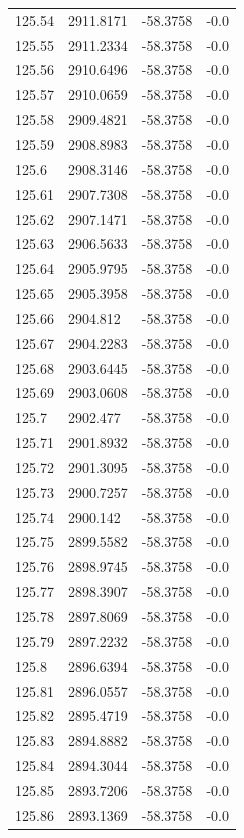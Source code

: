 \begin{table}[H]
\begin{tabular}{llll}
125.54 & 2911.8171 & -58.3758 & -0.0 \\
125.55 & 2911.2334 & -58.3758 & -0.0 \\
125.56 & 2910.6496 & -58.3758 & -0.0 \\
125.57 & 2910.0659 & -58.3758 & -0.0 \\
125.58 & 2909.4821 & -58.3758 & -0.0 \\
125.59 & 2908.8983 & -58.3758 & -0.0 \\
125.6 & 2908.3146 & -58.3758 & -0.0 \\
125.61 & 2907.7308 & -58.3758 & -0.0 \\
125.62 & 2907.1471 & -58.3758 & -0.0 \\
125.63 & 2906.5633 & -58.3758 & -0.0 \\
125.64 & 2905.9795 & -58.3758 & -0.0 \\
125.65 & 2905.3958 & -58.3758 & -0.0 \\
125.66 & 2904.812 & -58.3758 & -0.0 \\
125.67 & 2904.2283 & -58.3758 & -0.0 \\
125.68 & 2903.6445 & -58.3758 & -0.0 \\
125.69 & 2903.0608 & -58.3758 & -0.0 \\
125.7 & 2902.477 & -58.3758 & -0.0 \\
125.71 & 2901.8932 & -58.3758 & -0.0 \\
125.72 & 2901.3095 & -58.3758 & -0.0 \\
125.73 & 2900.7257 & -58.3758 & -0.0 \\
125.74 & 2900.142 & -58.3758 & -0.0 \\
125.75 & 2899.5582 & -58.3758 & -0.0 \\
125.76 & 2898.9745 & -58.3758 & -0.0 \\
125.77 & 2898.3907 & -58.3758 & -0.0 \\
125.78 & 2897.8069 & -58.3758 & -0.0 \\
125.79 & 2897.2232 & -58.3758 & -0.0 \\
125.8 & 2896.6394 & -58.3758 & -0.0 \\
125.81 & 2896.0557 & -58.3758 & -0.0 \\
125.82 & 2895.4719 & -58.3758 & -0.0 \\
125.83 & 2894.8882 & -58.3758 & -0.0 \\
125.84 & 2894.3044 & -58.3758 & -0.0 \\
125.85 & 2893.7206 & -58.3758 & -0.0 \\
125.86 & 2893.1369 & -58.3758 & -0.0 \\

\end{tabular}
\end{table}

